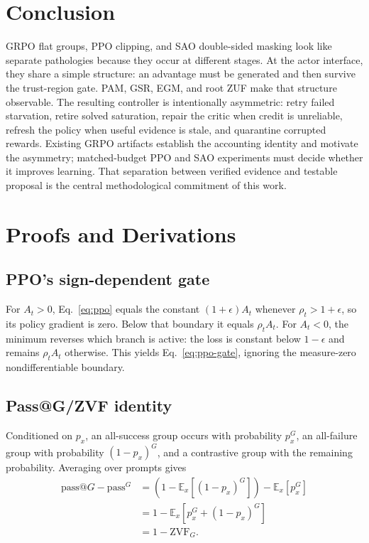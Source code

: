 \documentclass{article}
\newcommand{\E}{\mathbb{E}}
\begin{document}
\section{Conclusion}

GRPO flat groups, PPO clipping, and SAO double-sided masking look like separate
pathologies because they occur at different stages.  At the actor interface,
they share a simple structure: an advantage must be generated and then survive
the trust-region gate.  PAM, GSR, EGM, and root ZUF make that structure
observable.  The resulting controller is intentionally asymmetric: retry
failed starvation, retire solved saturation, repair the critic when credit is
unreliable, refresh the policy when useful evidence is stale, and quarantine
corrupted rewards.  Existing GRPO artifacts establish the accounting identity
and motivate the asymmetry; matched-budget PPO and SAO experiments must decide
whether it improves learning.  That separation between verified evidence and
testable proposal is the central methodological commitment of this work.




\appendix

\section{Proofs and Derivations}
\label{app:proofs}

\subsection{PPO's sign-dependent gate}

For $A_t>0$, Eq.~\eqref{eq:ppo} equals the constant
$(1+\epsilon)A_t$ whenever $\rho_t>1+\epsilon$, so its policy gradient is zero.
Below that boundary it equals $\rho_tA_t$.  For $A_t<0$, the minimum reverses
which branch is active: the loss is constant below $1-\epsilon$ and remains
$\rho_tA_t$ otherwise.  This yields Eq.~\eqref{eq:ppo-gate}, ignoring the
measure-zero nondifferentiable boundary.

\subsection{Pass@G/ZVF identity}

Conditioned on $p_x$, an all-success group occurs with probability $p_x^G$,
an all-failure group with probability $(1-p_x)^G$, and a contrastive group
with the remaining probability.  Averaging over prompts gives
\begin{align*}
  \mathrm{pass@}G-\mathrm{pass}^{G}
  &=\left(1-\E_x[(1-p_x)^G]\right)-\E_x[p_x^G]\\
  &=1-\E_x[p_x^G+(1-p_x)^G]\\
  &=1-\mathrm{ZVF}_G.
\end{align*}
\end{document}
